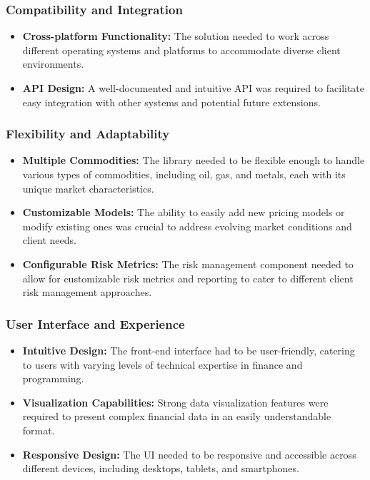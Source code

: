 \documentclass[12pt]{article}
\begin{document}
\subsubsection{Compatibility and Integration}
\begin{itemize}
\item \textbf{Cross-platform Functionality:} The solution needed to work across different operating systems and platforms to accommodate diverse client environments.

\item \textbf{API Design:} A well-documented and intuitive API was required to facilitate easy integration with other systems and potential future extensions.
\end{itemize}
\subsubsection{Flexibility and Adaptability}
\begin{itemize}
\item \textbf{Multiple Commodities:} The library needed to be flexible enough to handle various types of commodities, including oil, gas, and metals, each with its unique market characteristics.
\item \textbf{Customizable Models:} The ability to easily add new pricing models or modify existing ones was crucial to address evolving market conditions and client needs.

\item \textbf{Configurable Risk Metrics:} The risk management component needed to allow for customizable risk metrics and reporting to cater to different client risk management approaches.
\end{itemize}
\subsubsection{User Interface and Experience}
\begin{itemize}
\item \textbf{Intuitive Design:} The front-end interface had to be user-friendly, catering to users with varying levels of technical expertise in finance and programming.
\item \textbf{Visualization Capabilities:} Strong data visualization features were required to present complex financial data in an easily understandable format.

\item \textbf{Responsive Design:} The UI needed to be responsive and accessible across different devices, including desktops, tablets, and smartphones.
\end{itemize}
\end{document}
